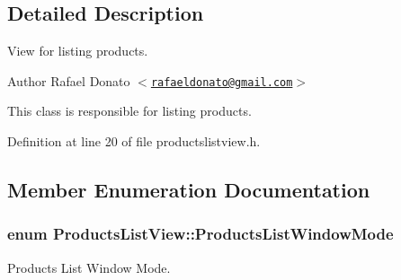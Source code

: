 \subsection{\-Detailed \-Description}
\-View for listing products. 

\begin{DoxyAuthor}{\-Author}
\-Rafael \-Donato $<$\href{mailto:rafaeldonato@gmail.com}{\tt rafaeldonato@gmail.\-com}$>$
\end{DoxyAuthor}
\-This class is responsible for listing products. 

\-Definition at line 20 of file productslistview.\-h.



\subsection{\-Member \-Enumeration \-Documentation}
\hypertarget{class_products_list_view_a9188ca0288825afb653acd945bfa9731}{
\subsubsection[{\-Products\-List\-Window\-Mode}]{\setlength{\rightskip}{0pt plus 5cm}enum {\bf \-Products\-List\-View\-::\-Products\-List\-Window\-Mode}}}\label{class_products_list_view_a9188ca0288825afb653acd945bfa9731}


\-Products \-List \-Window \-Mode. 

